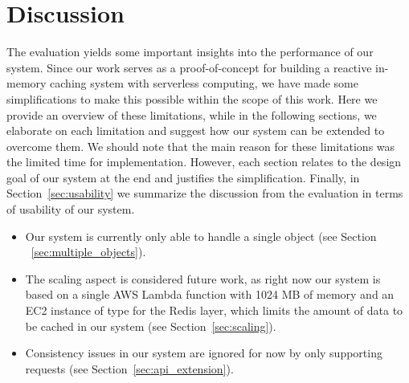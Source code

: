 \chapter{Discussion}
\label{cha:discussion_and_outlook}
The evaluation yields some important insights into the performance of our system. Since our work serves as a proof-of-concept for building a reactive in-memory caching system with serverless computing, we have made some simplifications to make this possible within the scope of this work. Here we provide an overview of these limitations, while in the following sections, we elaborate on each limitation and suggest how our system can be extended to overcome them. We should note that the main reason for these limitations was the limited time for implementation. However, each section relates to the design goal of our system at the end and justifies the simplification. Finally, in Section~\ref{sec:usability} we summarize the discussion from the evaluation in terms of usability of our system. 


\begin{itemize}
    \item Our system is currently only able to handle a single object (see Section ~\ref{sec:multiple_objects}).
    \item The scaling aspect is considered future work, as right now our system is based on a single AWS Lambda function with 1024 MB of memory and an EC2 instance of type  for the Redis layer, which limits the amount of data to be cached in our system (see Section~\ref{sec:scaling}).
    \item Consistency issues in our system are ignored for now by only supporting  requests (see Section~\ref{sec:api_extension}).
\end{itemize}

